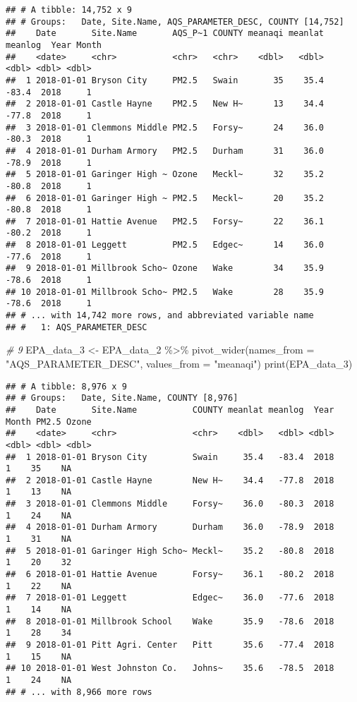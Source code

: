 \documentclass[
]{article}
\newenvironment{Shaded}{\begin{snugshade}}{\end{snugshade}}
\newcommand{\AttributeTok}[1]{\textcolor[rgb]{0.77,0.63,0.00}{#1}}
\newcommand{\CommentTok}[1]{\textcolor[rgb]{0.56,0.35,0.01}{\textit{#1}}}
\newcommand{\FunctionTok}[1]{\textcolor[rgb]{0.00,0.00,0.00}{#1}}
\newcommand{\NormalTok}[1]{#1}
\newcommand{\OtherTok}[1]{\textcolor[rgb]{0.56,0.35,0.01}{#1}}
\newcommand{\SpecialCharTok}[1]{\textcolor[rgb]{0.00,0.00,0.00}{#1}}
\newcommand{\StringTok}[1]{\textcolor[rgb]{0.31,0.60,0.02}{#1}}
\begin{document}
\begin{verbatim}
## # A tibble: 14,752 x 9
## # Groups:   Date, Site.Name, AQS_PARAMETER_DESC, COUNTY [14,752]
##    Date       Site.Name       AQS_P~1 COUNTY meanaqi meanlat meanlog  Year Month
##    <date>     <chr>           <chr>   <chr>    <dbl>   <dbl>   <dbl> <dbl> <dbl>
##  1 2018-01-01 Bryson City     PM2.5   Swain       35    35.4   -83.4  2018     1
##  2 2018-01-01 Castle Hayne    PM2.5   New H~      13    34.4   -77.8  2018     1
##  3 2018-01-01 Clemmons Middle PM2.5   Forsy~      24    36.0   -80.3  2018     1
##  4 2018-01-01 Durham Armory   PM2.5   Durham      31    36.0   -78.9  2018     1
##  5 2018-01-01 Garinger High ~ Ozone   Meckl~      32    35.2   -80.8  2018     1
##  6 2018-01-01 Garinger High ~ PM2.5   Meckl~      20    35.2   -80.8  2018     1
##  7 2018-01-01 Hattie Avenue   PM2.5   Forsy~      22    36.1   -80.2  2018     1
##  8 2018-01-01 Leggett         PM2.5   Edgec~      14    36.0   -77.6  2018     1
##  9 2018-01-01 Millbrook Scho~ Ozone   Wake        34    35.9   -78.6  2018     1
## 10 2018-01-01 Millbrook Scho~ PM2.5   Wake        28    35.9   -78.6  2018     1
## # ... with 14,742 more rows, and abbreviated variable name
## #   1: AQS_PARAMETER_DESC
\end{verbatim}

\begin{Shaded}
\begin{Highlighting}[]
\CommentTok{\# 9}
\NormalTok{EPA\_data\_3 }\OtherTok{\textless{}{-}}\NormalTok{ EPA\_data\_2 }\SpecialCharTok{\%\textgreater{}\%}
    \FunctionTok{pivot\_wider}\NormalTok{(}\AttributeTok{names\_from =} \StringTok{"AQS\_PARAMETER\_DESC"}\NormalTok{, }\AttributeTok{values\_from =} \StringTok{"meanaqi"}\NormalTok{)}
\FunctionTok{print}\NormalTok{(EPA\_data\_3)}
\end{Highlighting}
\end{Shaded}

\begin{verbatim}
## # A tibble: 8,976 x 9
## # Groups:   Date, Site.Name, COUNTY [8,976]
##    Date       Site.Name           COUNTY meanlat meanlog  Year Month PM2.5 Ozone
##    <date>     <chr>               <chr>    <dbl>   <dbl> <dbl> <dbl> <dbl> <dbl>
##  1 2018-01-01 Bryson City         Swain     35.4   -83.4  2018     1    35    NA
##  2 2018-01-01 Castle Hayne        New H~    34.4   -77.8  2018     1    13    NA
##  3 2018-01-01 Clemmons Middle     Forsy~    36.0   -80.3  2018     1    24    NA
##  4 2018-01-01 Durham Armory       Durham    36.0   -78.9  2018     1    31    NA
##  5 2018-01-01 Garinger High Scho~ Meckl~    35.2   -80.8  2018     1    20    32
##  6 2018-01-01 Hattie Avenue       Forsy~    36.1   -80.2  2018     1    22    NA
##  7 2018-01-01 Leggett             Edgec~    36.0   -77.6  2018     1    14    NA
##  8 2018-01-01 Millbrook School    Wake      35.9   -78.6  2018     1    28    34
##  9 2018-01-01 Pitt Agri. Center   Pitt      35.6   -77.4  2018     1    15    NA
## 10 2018-01-01 West Johnston Co.   Johns~    35.6   -78.5  2018     1    24    NA
## # ... with 8,966 more rows
\end{verbatim}
\end{document}
